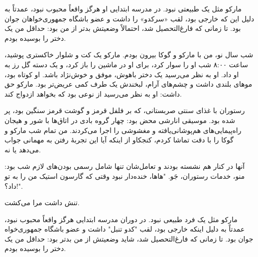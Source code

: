 مارکو مثل یک طبیعتی نبود. در مدرسه ابتدایی او هرگز واقعاً محبوب نبود، عمدتاً به دلیل این که خارجی بود، لقب «سرکدو» را داشت و عضو باشگاه جمهوری‌خواهان جوان بود. تا زمانی که فارغ‌التحصیل شد، احتمالاً وضعیتش بدتر از من بود: حداقل من یک دختر را بوسیده بودم.

شب سال نو، من با مارکو و گوکا بیرون بودم. مارکو یک کت و شلوار خاکستری پوشید، ساعت ۸:۰۰ شب او را سوار کرد، برای او در ماشین را باز کرد، و یک دسته گل رز به او داد. او به نظر می‌رسید یک دختر باهوش، موفق و خوش‌نژاد باشد. او کوتاه بود، موهای بلندی داشت و چشم‌های آرام، لبخندش یک طرف کمی عریض‌تر بود. مارکو حق داشت: او به نظر می‌رسید از نوعی بود که بخواهد ازدواج کند.

رستوران با غذای سنتی صربستانی، که بر فلفل قرمز و گوشت قرمز سنگین بود، پر شده بود. موسیقی انارشی محض بود: چهار گروه بادی در اتاق‌ها با شور و هیجان راه‌پیمایی‌های هم‌پوشانی‌یافته و مغشوشی را اجرا می‌کردند. من تمام شب مارکو و گوکا را با دقت تماشا کردم، کنجکاو از اینکه آیا این تجربهٔ رفتن به مهمانی جواب می‌دهد یا نه.

آنها در کنار هم نشسته بودند و تعامل‌شان تنها شامل رسمی بودن‌های لازم شب بود: منو، خدمات رستوران، جَو. "هاها، خنده‌دار نبود وقتی که گارسون استیک من را به تو داد؟!".

تنش داشت مرا می‌کشت.

مارکو مثل یک فرد طبیعی نبود. در دوران مدرسه ابتدایی هرگز واقعاً محبوب نبود، عمدتاً به دلیل اینکه خارجی بود، لقب "کدو تنبل" داشت و عضو باشگاه جمهوری‌خواه جوان بود. تا زمانی که فارغ‌التحصیل شد، شاید وضعیتش از من بدتر بود: حداقل من یک دختر را بوسیده بودم.